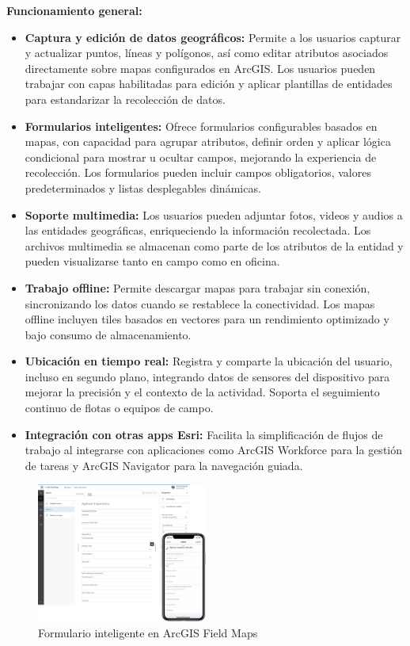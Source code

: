 \documentclass[12pt, a4paper]{book}
\begin{document}
\textbf{Funcionamiento general:}
\begin{itemize}
  \item \textbf{Captura y edición de datos geográficos:} Permite a los usuarios capturar y actualizar puntos, líneas y polígonos, así como editar atributos asociados directamente sobre mapas configurados en ArcGIS. Los usuarios pueden trabajar con capas habilitadas para edición y aplicar plantillas de entidades para estandarizar la recolección de datos.
  
  \item \textbf{Formularios inteligentes:} Ofrece formularios configurables basados en mapas, con capacidad para agrupar atributos, definir orden y aplicar lógica condicional para mostrar u ocultar campos, mejorando la experiencia de recolección. Los formularios pueden incluir campos obligatorios, valores predeterminados y listas desplegables dinámicas.
  
  \item \textbf{Soporte multimedia:} Los usuarios pueden adjuntar fotos, videos y audios a las entidades geográficas, enriqueciendo la información recolectada. Los archivos multimedia se almacenan como parte de los atributos de la entidad y pueden visualizarse tanto en campo como en oficina.
  
  \item \textbf{Trabajo offline:} Permite descargar mapas para trabajar sin conexión, sincronizando los datos cuando se restablece la conectividad. Los mapas offline incluyen tiles basados en vectores para un rendimiento optimizado y bajo consumo de almacenamiento.
  
  \item \textbf{Ubicación en tiempo real:} Registra y comparte la ubicación del usuario, incluso en segundo plano, integrando datos de sensores del dispositivo para mejorar la precisión y el contexto de la actividad. Soporta el seguimiento continuo de flotas o equipos de campo.
  
  \item \textbf{Integración con otras apps Esri:} Facilita la simplificación de flujos de trabajo al integrarse con aplicaciones como ArcGIS Workforce para la gestión de tareas y ArcGIS Navigator para la navegación guiada.
\end{itemize}

\begin{figure}[h]
  \centering
  \includegraphics[width=0.5\textwidth]{images/FieldMapsSmartForms.png}
  \caption{Formulario inteligente en ArcGIS Field Maps}
  \label{fig:fieldmapsform}
\end{figure}
\end{document}
